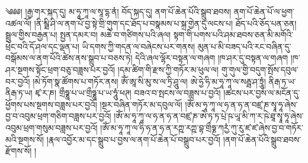 \setcounter{footnote}{0} 
༄༅༅། །རྒྱ་གར་སྐད་དུ། མ་ཧཱ་ཀཱ་ལ་སཱ་དྷ་ནཾ། བོད་སྐད་དུ། ནག་པོ་ཆེན་པོའི་སྒྲུབ་ཐབས། ནག་པོ་ཆེན་པོ་ལ་ཕྱག་འཚལ་ལོ། །ནི་མྠི་ཤི་ལ་ནག་པོ་བྱ་སྟེ་གྲི་གུག་དང་ཐོད་པ་བསྣམས་པ་སྐྲ་གྱེན་དུ་ལངས་པ། ཐོད་པའི་ཅོད་པན་ཅན། སྦྲུལ་གྱིས་བརྒྱན་པ། སྤྱན་དམར་བ། མཆེ་བ་གཙིགས་པའི་ཞལ། སྟག་གི་པགས་པའི་ཤམ་ཐབས་ཅན་མི་མགོའི་ཕྲེང་བའི་དོ་ཤལ་དང་ལྡན་པ། ཡི་དགས་ཀྱི་གདན་ལ་བཞེངས་པར་གནས། མུན་པ་མི་བཟད་པའི་རང་བཞིན་དུ་བསྒོམས་ལ་ནག་པོའི་ཚེས་ནས་སྒྲུབ་པ་བཅས་ཏེ། དེའི་ཞལ་ལྷོར་བསྟན་ལ་གཞག །ཁ་ཤར་དུ་བསྟན་ལ་གཞག །ཁ་ཤར་སྔགས་སྟོང་ཕྲག་བཅུ་བཟླས་པར་བྱའོ། །དམ་ཚིག་གི་རྫས་ཀྱི་གཏོར་མ་ཕུལ་ལ། གུ་གུལ་གྱི་བདུག་སྤོས་དབུལ་བར་བྱའོ། །མེ་ཏོག་སྣ་ཚོགས་པ་གཏོར་ནས། ཨོཾ་ཨཱ་སི་མུ་ས་ལ་ཏྲི་ཤཱུ་ལ། ཨེ་ཧྱེ་ཧི་མ་ཧཱ་ཀཱ་ལ་སརྦྦ་ཤ་ཏྲཱུཾ། ནིརྒ་ཏ་ཡ་ནིརྒ་ཏ་ཡ། ཛྭ་ར་ཎ། གྲྀཧྞཱ་པ་ཡ་གྲྀཧྞཱ་པ་ཡ་ཧཱུཾ་ཕཊ། བཟའ་བ་སྤངས་ལ་བཟླས་པ་བྱའོ། །ཚངས་པར་བྱས་ལ་མངོན་དུ་ཕྱོགས་པས་སྔགས་བཟླས་པར་བྱའོ། །སྔར་བཞིན་གཏོར་མ་དབུལ་ལོ། །ཨོཾ་མ་ཧཱ་ཀཱ་ལ་ཧ་ན་ཧ་ན་བཛྲ་ཎ་སྭཱ་ཧཱ་ཞེས་བྱ་བ་འབུམ་ཕྲག་གཅིག་བཟླས་པར་བྱའོ། །ཨོཾ་མ་ཧཱ་ཀཱ་ལ་ཧ་ན་ཧ་ན་བཛྲ་ཎ་ཨེ་ཏ་ཏ་པྲེ་ཥ་ཡཱ་མི་ཀ་ར་ཥེ་ཐཱ་སྭཱ་ཧཱ་ཞེས་འབུམ་ཕྲག་གསུམ་བཟླས་པར་བྱའོ། །ཨོཾ་མ་ཧཱ་ཀཱ་ལ་ཧི་ཧ་ན་ཧ་ན་རཀྵ་རཀྵ་བྷ་གྲྀཧྞ་ཀརྱཾ་ཀུ་རུ་ཛ་ཛ་ཞེས་བྱ་བ་གཏོར་མའི་སྔགས་སོ། །རྣལ་འབྱོར་མ་དང་སྒྲུབ་པ་བྱས་ལ་ནག་པོ་ཆེན་པོ་བསྒྲུབ་པར་བྱའོ། །ནག་པོ་ཆེན་པོའི་སྒྲུབ་ཐབས་རྫོགས་སོ། །